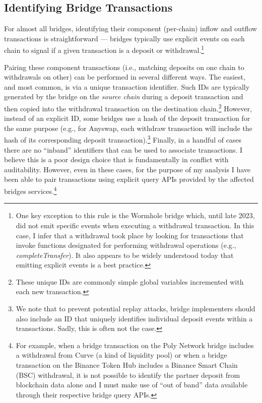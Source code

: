 \subsection{Identifying Bridge Transactions}
For almost all bridges, identifying their component (per-chain) inflow
and outflow transactions is straightforward --- bridges typically use
explicit events on each chain to signal if a given transaction is a
deposit or withdrawal.\footnote{One key exception to this rule is the
  Wormhole bridge which, until late 2023, did not emit specific
  events when executing a withdrawal transaction.  In this case, I infer that a withdrawal took
  place by looking for transactions that invoke functions designated for performing withdrawal operations (e.g., \textit{completeTransfer}).
  It also appears to be widely understood today that emitting
  explicit events is a best practice.}

Pairing these component transactions (i.e., matching deposits on one
chain to withdrawals on other) can be performed in several different
ways.  The easiest, and most common, is via a unique transaction
identifier. Such IDs are typically generated by the bridge on the
\emph{source chain} during a deposit transaction and then copied into
the withdrawal transaction on the destination chain.\footnote{These
  unique IDs are commonly simple global variables incremented with
  each new transaction.}  However, instead of an explicit ID, some
bridges use a hash of the deposit transaction for the same purpose
(e.g., for Anyswap, each withdraw transaction will include the hash of
its corresponding deposit transaction).\footnote{We note that to prevent potential replay attacks, bridge implementers should also include an ID that uniquely identifies individual deposit events within a transactions. Sadly, this is often not the case.}  Finally, in a handful of cases there are
no ``inband'' identifiers that can be used to associate transactions.
I believe this is a poor design choice that is fundamentally in
conflict with auditability.  However, even in these cases, for the
purpose of my analysis I have been able to pair transactions using
explicit query APIs provided by the affected bridges
services.\footnote{For example, when a bridge transaction on the Poly
  Network bridge includes a withdrawal from Curve (a kind of liquidity
  pool) or when a bridge transaction on the Binance Token Hub includes
  a Binance Smart Chain (BSC) withdrawal, it is not possible to
  identify the partner deposit from blockchain data alone and I must
  make use of ``out of band'' data available through their respective
  bridge query APIs.}

